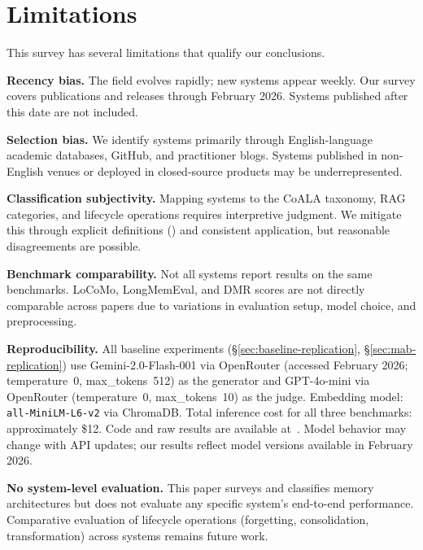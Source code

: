 \section{Limitations}
\label{sec:limitations}

This survey has several limitations that qualify our conclusions.

\textbf{Recency bias.} The field evolves rapidly; new systems appear
weekly. Our survey covers publications and releases through February
2026. Systems published after this date are not included.

\textbf{Selection bias.} We identify systems primarily through
English-language academic databases, GitHub, and practitioner blogs.
Systems published in non-English venues or deployed in closed-source
products may be underrepresented.

\textbf{Classification subjectivity.} Mapping systems to the CoALA
taxonomy, RAG categories, and lifecycle operations requires
interpretive judgment. We mitigate this through explicit definitions
() and consistent application, but reasonable
disagreements are possible.

\textbf{Benchmark comparability.} Not all systems report results on
the same benchmarks. LoCoMo, LongMemEval, and DMR scores are not
directly comparable across papers due to variations in evaluation
setup, model choice, and preprocessing.

\textbf{Reproducibility.} All baseline experiments
(\S\ref{sec:baseline-replication}, \S\ref{sec:mab-replication}) use
Gemini-2.0-Flash-001 via OpenRouter (accessed February 2026;
temperature~0, max\_tokens~512) as the generator and GPT-4o-mini via
OpenRouter (temperature~0, max\_tokens~10) as the judge.  Embedding
model: \texttt{all-MiniLM-L6-v2} via ChromaDB.  Total inference cost
for all three benchmarks: approximately \$12.  Code and raw results are
available at~\cite{alaya2026}.  Model
behavior may change with API updates; our results reflect model versions
available in February 2026.

\textbf{No system-level evaluation.} This paper surveys and classifies
memory architectures but does not evaluate any specific system's
end-to-end performance. Comparative evaluation of lifecycle operations
(forgetting, consolidation, transformation) across systems remains
future work.
